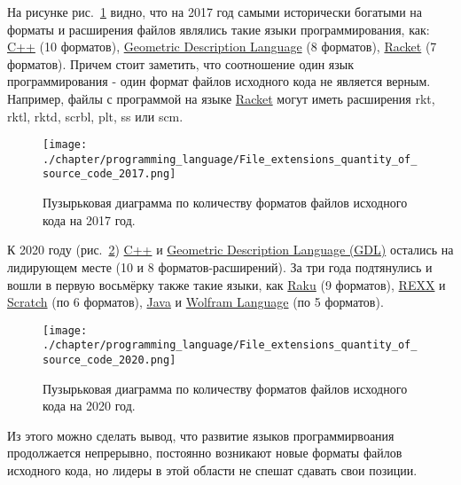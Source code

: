 На рисунке рис.~\ref{fig:source_format_2017} видно, что на 2017 год самыми исторически богатыми на форматы и расширения файлов являлись такие языки программирования, как: \href{https://en.wikipedia.org/wiki/C++}{C++} (10 форматов), \href{https://en.wikipedia.org/wiki/Geometric_Description_Language}{Geometric Description Language} (8 форматов), \href{https://en.wikipedia.org/wiki/Racket_(programming_language)}{Racket} (7 форматов). Причем стоит заметить, что соотношение один язык программирования - один формат файлов исходного кода не является верным. Например, файлы с программой на языке \href{https://en.wikipedia.org/wiki/Racket_(programming_language)}{Racket} могут иметь расширения rkt, rktl, rktd, scrbl, plt, ss или scm.

\begin{figure}
\centering
	\texttt{[image: ./chapter/programming\_language/File\_extensions\_quantity\_of\_source\_code\_2017.png]}
	\label{fig:source_format_2017}
	\caption{Пузырьковая диаграмма по количеству форматов файлов исходного кода на 2017 год.}
\end{figure}
К 2020 году (рис.~\ref{fig:source_format_2020}) \href{https://en.wikipedia.org/wiki/C++}{C++} и \href{https://en.wikipedia.org/wiki/Geometric_Description_Language}{Geometric Description Language (GDL)} остались на лидирующем месте (10 и 8 форматов-расширений). За три года подтянулись и вошли в первую восьмёрку также такие языки, как \href{https://en.wikipedia.org/wiki/Raku_(programming_language)}{Raku} (9 форматов), \href{https://en.wikipedia.org/wiki/Rexx}{REXX} и \href{https://en.wikipedia.org/wiki/Scratch_(programming_language)}{Scratch} (по 6 форматов), \href{https://ru.wikipedia.org/wiki/Java}{Java} и \href{https://en.wikipedia.org/wiki/Wolfram_Language}{Wolfram Language} (по 5 форматов).
\begin{figure}
\centering
	\texttt{[image: ./chapter/programming\_language/File\_extensions\_quantity\_of\_source\_code\_2020.png]}
	\label{fig:source_format_2020}
	\caption{Пузырьковая диаграмма по количеству форматов файлов исходного кода на 2020 год.}
\end{figure}

Из этого можно сделать вывод, что развитие языков программирвоания продолжается непрерывно, постоянно возникают новые форматы файлов исходного кода, но лидеры в этой области не спешат сдавать свои позиции.


